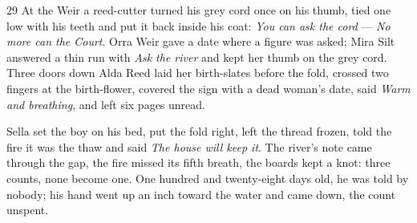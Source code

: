 \begin{CRchronicle}{29}
At the Weir a reed-cutter turned his grey cord once on his thumb, tied one low with his teeth and put it back inside his coat: \emph{You can ask the cord} --- \emph{No more can the Court}. Orra Weir gave a date where a figure was asked; Mira Silt answered a thin run with \emph{Ask the river} and kept her thumb on the grey cord. Three doors down Alda Reed laid her birth-slates before the fold, crossed two fingers at the birth-flower, covered the sign with a dead woman’s date, said \emph{Warm and breathing}, and left six pages unread.

Sella set the boy on his bed, put the fold right, left the thread frozen, told the fire it was the thaw and said \emph{The house will keep it}. The river’s note came through the gap, the fire missed its fifth breath, the boards kept a knot: three counts, none become one. One hundred and twenty-eight days old, he was told by nobody; his hand went up an inch toward the water and came down, the count unspent.
\end{CRchronicle}
